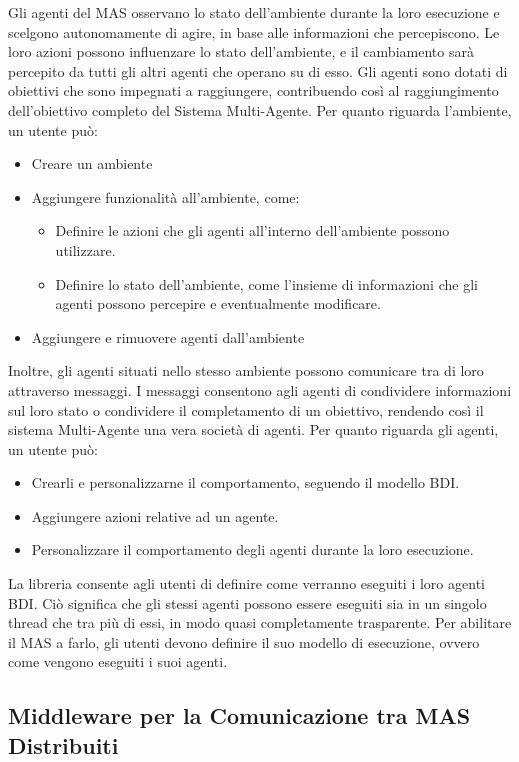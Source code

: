Gli agenti del MAS osservano lo stato dell'ambiente durante la loro esecuzione e scelgono autonomamente di agire, in base alle informazioni che percepiscono. Le loro azioni possono influenzare lo stato dell'ambiente, e il cambiamento sarà percepito da tutti gli altri agenti che operano su di esso. Gli agenti sono dotati di obiettivi che sono impegnati a raggiungere, contribuendo così al raggiungimento dell'obiettivo completo del Sistema Multi-Agente. Per quanto riguarda l'ambiente, un utente può:

\begin{itemize}
    \item Creare un ambiente
    \item Aggiungere funzionalità all'ambiente, come:
    \begin{itemize}
        \item Definire le azioni che gli agenti all'interno dell'ambiente possono utilizzare.
        \item Definire lo stato dell'ambiente, come l'insieme di informazioni che gli agenti possono percepire e eventualmente modificare.
    \end{itemize}
    \item Aggiungere e rimuovere agenti dall'ambiente
\end{itemize}

Inoltre, gli agenti situati nello stesso ambiente possono comunicare tra di loro attraverso messaggi. I messaggi consentono agli agenti di condividere informazioni sul loro stato o condividere il completamento di un obiettivo, rendendo così il sistema Multi-Agente una vera società di agenti. Per quanto riguarda gli agenti, un utente può:

\begin{itemize}
    \item Crearli e personalizzarne il comportamento, seguendo il modello BDI.
    \item Aggiungere azioni relative ad un agente.
    \item Personalizzare il comportamento degli agenti durante la loro esecuzione.
\end{itemize}

La libreria consente agli utenti di definire come verranno eseguiti i loro agenti BDI. Ciò significa che gli stessi agenti possono essere eseguiti sia in un singolo thread che tra più di essi, in modo quasi completamente trasparente. Per abilitare il MAS a farlo, gli utenti devono definire il suo modello di esecuzione, ovvero come vengono eseguiti i suoi agenti.

\subsection{Middleware per la Comunicazione tra MAS Distribuiti}
